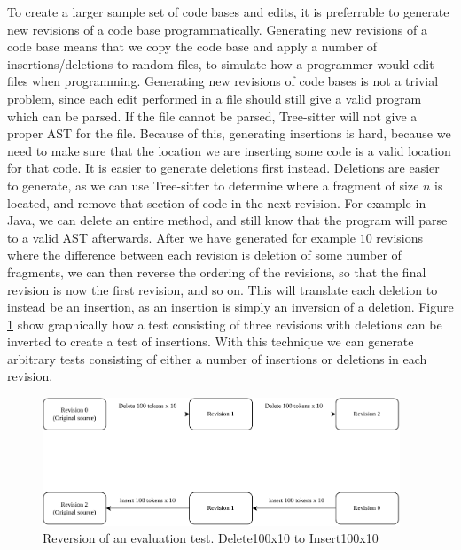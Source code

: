 To create a larger sample set of code bases and edits, it is preferrable to generate new
revisions of a code base programmatically. Generating new revisions of a code base means
that we copy the code base and apply a number of insertions/deletions to random files, to
simulate how a programmer would edit files when programming. Generating new revisions of
code bases is not a trivial problem, since each edit performed in a file should still give
a valid program which can be parsed. If the file cannot be parsed, Tree-sitter will not
give a proper AST for the file. Because of this, generating insertions is hard, because we
need to make sure that the location we are inserting some code is a valid location for
that code. It is easier to generate deletions first instead. Deletions are easier to
generate, as we can use Tree-sitter to determine where a fragment of size $n$ is located,
and remove that section of code in the next revision. For example in Java, we can delete
an entire method, and still know that the program will parse to a valid AST afterwards.
After we have generated for example $10$ revisions where the difference between each
revision is deletion of some number of fragments, we can then reverse the ordering of the
revisions, so that the final revision is now the first revision, and so on. This will
translate each deletion to instead be an insertion, as an insertion is simply an inversion
of a deletion. Figure \ref{fig:revisioninversion} show graphically how a test consisting
of three revisions with deletions can be inverted to create a test of insertions. With
this technique we can generate arbitrary tests consisting of either a number of insertions
or deletions in each revision.

\begin{figure}[t]
    \begin{center}
        \includegraphics[width=0.95\textwidth]{figures/revisioninversion.drawio.pdf}
    \end{center}
    \caption{Reversion of an evaluation test. Delete100x10 to Insert100x10}
    \label{fig:revisioninversion}
\end{figure}


